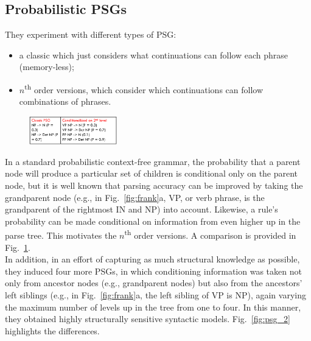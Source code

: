 \subsection{Probabilistic PSGs}
They experiment with different types of PSG:
\begin{itemize}
    \item a classic which just considers what continuations can follow each phrase (memory-less);
\end{itemize}

\begin{itemize}
    \item $n$\textsuperscript{th} order versions, which consider which continuations can follow combinations of phrases.
\end{itemize}

\begin{figure}
  \centering
  \includegraphics[width=0.34\textwidth]{images/psg.png}
  \caption{}
  \label{fig:psg}
\end{figure}

In a standard probabilistic context-free grammar, the probability that a parent node will produce a particular set of children is conditional only on the parent node, but it is well known that parsing accuracy can be improved by taking the grandparent node (e.g., in Fig.~\ref{fig:frank}a, VP, or verb phrase, is the grandparent of the rightmost IN and NP) into account. Likewise, a rule's probability can be made conditional on information from even higher up in the parse tree. This motivates the $n$\textsuperscript{th} order versions. A comparison is provided in Fig.~\ref{fig:psg}.\\

In addition, in an effort of capturing as much structural knowledge as possible, they induced four more PSGs, in which conditioning information was taken not only from ancestor nodes (e.g., grandparent nodes) but also from the ancestors' left siblings (e.g., in Fig.~\ref{fig:frank}a, the left sibling of VP is NP), again varying the maximum number of levels up in the tree from one to four. In this manner, they obtained highly structurally sensitive syntactic models. Fig.~\ref{fig:psg_2} highlights the differences.

